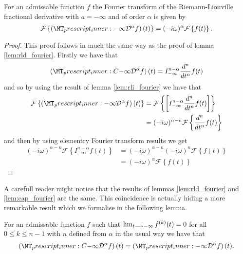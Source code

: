 \begin{lemma}
    \label{lem:cap_fourier}
    For an admissable function $ f $ the Fourier transform of the Riemann-Liouville fractional derivative with $ a = -\infty $ and of order $ \alpha $ is given by
    \begin{align}
        \mathcal{F}\left\{ \left(\prescript{}{-\infty}{\mathcal{D}}^\alpha f\right)(t) \right\} = (-i\omega)^{\alpha} \mathcal{F}\left\{ f(t) \right\}.
    \end{align}
\end{lemma}
\begin{proof}
This proof follows in much the same way as the proof of lemma \ref{lem:rld_fourier}.
Firstly we have that
    \begin{align}
        \left(\prescript{C}{-\infty}{\mathcal{D}}^\alpha f\right)(t) =  I_{-\infty}^{n - \alpha} \frac{d^n}{dt^n}f(t)
    \end{align}
    and so by using the result of lemma \ref{lem:rli_fourier} we have that
    \begin{align}
        \mathcal{F}\left\{ \left(\prescript{}{-\infty}{\mathcal{D}}^\alpha f\right)(t) \right\}  &=
        \mathcal{F}\left\{ \left[ I_{-\infty}^{n-\alpha} \frac{d^n}{dt^n}f(t) \right] \right\} \\
        &= (-i\omega)^{\alpha - n} \mathcal{F}\left\{ \frac{d^n}{dt^n}f(t) \right\}
    \end{align}
    and then by using elementry Fourier transform results we get
    \begin{align}
        (-i\omega)^{\alpha -n} \mathcal{F}\left\{ I_{-\infty}^{n-\alpha} f(t) \right\} &= (-i\omega)^{\alpha - n}(-i\omega)^{n}\mathcal{F}\left\{ f(t)\right\} \\
        &= (-i\omega)^\alpha  \mathcal{F}\left\{ f(t) \right\}
    \end{align}
\end{proof}
A carefull reader might notice that the results of lemmas \ref{lem:rld_fourier} and \ref{lem:cap_fourier} are the same. This coincidence is actually hiding a more remarkable result which we formalise in the following lemma.

\begin{lemma}
    For an admissable function $ f $ such that $ \lim_{t \longrightarrow -\infty} f^{(k)}(t) = 0 $ for all $ 0 \leq k \leq n-1 $ with $ n $ defined from $ \alpha $ in the usual way we have that
    \begin{align}
        \left(\prescript{C}{-\infty}{\mathcal{D}}^\alpha f\right)(t) = \left( \prescript{}{-\infty}{\mathcal{D}}^\alpha f \right)(t).
    \end{align}
\end{lemma}

